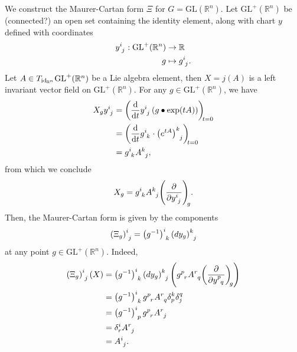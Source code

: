 \begin{example}
    We construct the Maurer-Cartan form \(\Xi\) for \(G = \mathrm{GL}(\mathbb{R}^n)\). Let \(\mathrm{GL}^+(\mathbb{R}^n)\) be (connected?) an open set containing the identity element, along with chart \(y\) defined with coordinates
    \begin{align*}
        y\indices{^i_j} : \mathrm{GL}^+(\mathbb{R}^n) &\to \mathbb{R}\\
                                                    g &\mapsto g\indices{^i_j}.
    \end{align*}
    Let \(A \in T_{\operatorname{id}_{\mathbb{R}^n}}\mathrm{GL}^+(\mathbb{R}^n)\) be a Lie algebra element, then \(X = j(A)\) is a left invariant vector field on \(\mathrm{GL}^+(\mathbb{R}^n)\). For any \(g \in \mathrm{GL}^+(\mathbb{R}^n)\), we have
    \begin{align*}
        X_g y\indices{^i_j} &= \diff*{y\indices{^i_j} \left(g \bullet \exp(tA)\right)}{t}[t=0]\\
                            &= \diff*{g\indices{^i_k} \cdot \left(e^{tA}\right)\indices{^k_j}}{t}[t=0]\\
                            &= g\indices{^i_k} A\indices{^k_j},
    \end{align*}
    from which we conclude
    \begin{equation*}
        X_g = g\indices{^i_k}A\indices{^k_j} \bvec{y\indices{^i_j}}{g}.
    \end{equation*}
    Then, the Maurer-Cartan form is given by the components
    \begin{equation*}
        \left(\Xi_g\right)\indices{^i_j} = \left(g^{-1}\right)\indices{^i_k} \left(dy_g\right)\indices{^k_j}
    \end{equation*}
    at any point \(g \in \mathrm{GL}^+(\mathbb{R}^n)\). Indeed,
    \begin{align*}
        \left(\Xi_g\right)\indices{^i_j}(X) &= \left(g^{-1}\right)\indices{^i_k} \left(dy_g\right)\indices{^k_j}\left(g\indices{^p_r}A\indices{^r_q} \bvec{y\indices{^p_q}}{g}\right)\\
                                            &= \left(g^{-1}\right)\indices{^i_k}g\indices{^p_r}A\indices{^r_q} \delta^k_p \delta^q_j\\
                                            &= \left(g^{-1}\right)\indices{^i_p}g\indices{^p_r}A\indices{^r_j} \\
                                            &= \delta^i_r A\indices{^r_j}\\
                                            &= A\indices{^i_j}.
    \end{align*}
\end{example}

